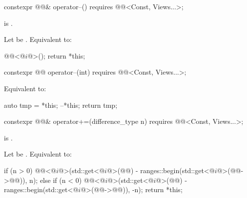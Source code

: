 %
\begin{itemdecl}
constexpr @@& operator--()
  requires @@<Const, Views...>;
\end{itemdecl}

\begin{itemdescr}
\pnum
\expects
{} is .

\pnum
\effects
Let  be .
Equivalent to:
\begin{codeblock}
@@<@$i$@>();
return *this;
\end{codeblock}
\end{itemdescr}

%
\begin{itemdecl}
constexpr @@ operator--(int)
  requires @@<Const, Views...>;
\end{itemdecl}

\begin{itemdescr}
\pnum
\effects
Equivalent to:
\begin{codeblock}
auto tmp = *this;
--*this;
return tmp;
\end{codeblock}
\end{itemdescr}

%
\begin{itemdecl}
constexpr @@& operator+=(difference_type n)
  requires @@<Const, Views...>;
\end{itemdecl}

\begin{itemdescr}
\pnum
\expects
{} is .

\pnum
\effects
Let  be .
Equivalent to:
\begin{codeblock}
if (n > 0) {
  @@<@$i$@>(std::get<@$i$@>(@@) - ranges::begin(std::get<@$i$@>(@@->@@)), n);
} else if (n < 0) {
  @@<@$i$@>(std::get<@$i$@>(@@) - ranges::begin(std::get<@$i$@>(@@->@@)), -n);
}
return *this;
\end{codeblock}
\end{itemdescr}

